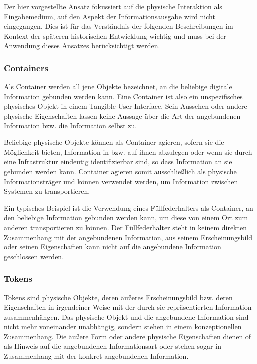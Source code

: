 Der hier vorgestellte Ansatz fokussiert auf die physische Interaktion als Eingabemedium, auf den Aspekt der Informationsausgabe wird nicht eingegangen. Dies ist für das Verständnis der folgenden Beschreibungen im Kontext der späteren historischen Entwicklung wichtig und muss bei der Anwendung dieses Ansatzes berücksichtigt werden. 

\subsubsection{Containers}

Als Container werden all jene Objekte bezeichnet, an die beliebige digitale Information gebunden werden kann. Eine Container ist also ein unspezifisches physisches Objekt in einem Tangible User Interface. Sein Aussehen oder andere physische Eigenschaften lassen keine Aussage über die Art der angebundenen Information bzw. die Information selbst zu. 

Beliebige physische Objekte können als Container agieren, sofern sie die Möglichkeit bieten, Information in bzw. auf ihnen abzulegen oder wenn sie durch eine Infrastruktur eindeutig identifizierbar sind, so dass Information an sie gebunden werden kann. Container agieren somit ausschließlich als physische Informationsträger und können verwendet werden, um Information zwischen Systemen zu transportieren. 

Ein typisches Beispiel ist die Verwendung eines Füllfederhalters als Container, an den beliebige Information gebunden werden kann, um diese von einem Ort zum anderen transportieren zu können. Der Füllfederhalter steht in keinem direkten Zusammenhang mit der angebundenen Information, aus seinem Erscheinungsbild oder seinen Eigenschaften kann nicht auf die angebundene Information geschlossen werden.

\subsubsection{Tokens}

Tokens sind physische Objekte, deren äußeres Erscheinungsbild bzw. deren Eigenschaften in irgendeiner Weise mit der durch sie repräsentierten Information zusammenhängen. Das physische Objekt und die angebundene Information sind nicht mehr voneinander unabhängig, sondern stehen in einem konzeptionellen Zusammenhang. Die äußere Form oder andere physische Eigenschaften dienen of als Hinweis auf die angebundenen Informationsart oder stehen sogar in Zusammenhang mit der konkret angebundenen Information.

